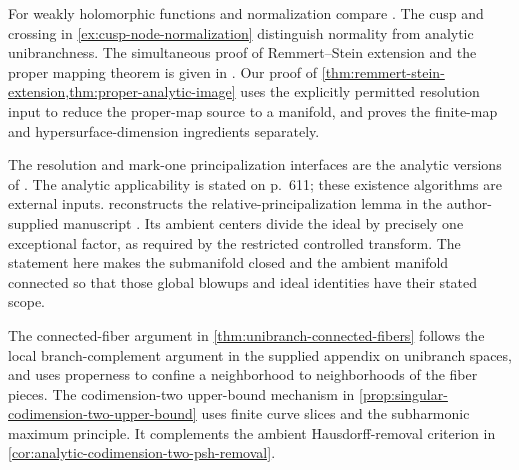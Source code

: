 For weakly holomorphic functions and normalization compare \cite[Chapter II, (7.1)--(7.15), pp.~110--116]{DemBook}. The cusp and crossing in \cref{ex:cusp-node-normalization} distinguish normality from analytic unibranchness. The simultaneous proof of Remmert--Stein extension and the proper mapping theorem is given in \cite[Chapter II, (8.7)--(8.8), pp.~118--121]{DemBook}. Our proof of \cref{thm:remmert-stein-extension,thm:proper-analytic-image} uses the explicitly permitted resolution input to reduce the proper-map source to a manifold, and proves the finite-map and hypersurface-dimension ingredients separately.

The resolution and mark-one principalization interfaces are the analytic versions of \cite[Theorems 1.1 and 1.3, pp.~611 and 614; Definitions 2.1--2.2, pp.~618--619]{BM08}. The analytic applicability is stated on p.~611; these existence algorithms are external inputs.  reconstructs the relative-principalization lemma in the author-supplied manuscript \cite[Lemma \texttt{relative-principalization}]{VuXiaNakamaye}. Its ambient centers divide the ideal by precisely one exceptional factor, as required by the restricted controlled transform. The statement here makes the submanifold closed and the ambient manifold connected so that those global blowups and ideal identities have their stated scope.

The connected-fiber argument in \cref{thm:unibranch-connected-fibers} follows the local branch-complement argument in the supplied appendix on unibranch spaces, and uses properness to confine a neighborhood to neighborhoods of the fiber pieces. The codimension-two upper-bound mechanism in \cref{prop:singular-codimension-two-upper-bound} uses finite curve slices and the subharmonic maximum principle. It complements the ambient Hausdorff-removal criterion in \cref{cor:analytic-codimension-two-psh-removal}.
